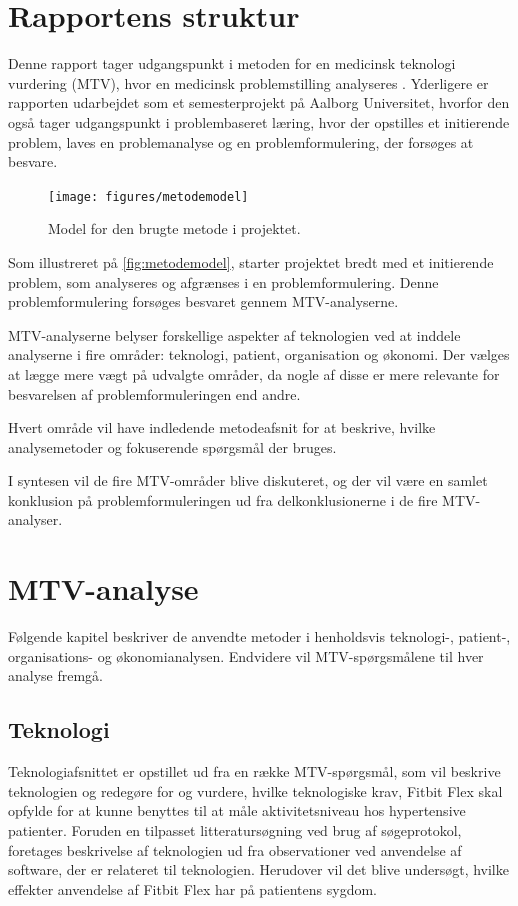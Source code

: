 \chapter{Rapportens struktur} \label{metode}
Denne rapport tager udgangspunkt i metoden for en medicinsk teknologi vurdering (MTV), hvor en medicinsk problemstilling analyseres \citep{mtvhaandbog}. Yderligere er rapporten udarbejdet som et semesterprojekt på Aalborg Universitet, hvorfor den også tager udgangspunkt i problembaseret læring, hvor der opstilles et initierende problem, laves en problemanalyse og en problemformulering, der forsøges at besvare. 


\begin{figure}[H]
	\centering
	\texttt{[image: figures/metodemodel]}
	\caption{Model for den brugte metode i projektet.}
	\label{fig:metodemodel}
\end{figure}

\noindent
Som illustreret på \autoref{fig:metodemodel}, starter projektet bredt med et initierende problem, som analyseres og afgrænses i en problemformulering. Denne problemformulering forsøges besvaret gennem MTV-analyserne. 

MTV-analyserne belyser forskellige aspekter af teknologien ved at inddele analyserne i fire områder: teknologi, patient, organisation og økonomi. Der vælges at lægge mere vægt på udvalgte områder, da nogle af disse er mere relevante for besvarelsen af problemformuleringen end andre. 

Hvert område vil have indledende metodeafsnit for at beskrive, hvilke analysemetoder og fokuserende spørgsmål der bruges. 

I syntesen vil de fire MTV-områder blive diskuteret, og der vil være en samlet konklusion på problemformuleringen ud fra delkonklusionerne i de fire MTV-analyser. 

\chapter{MTV-analyse}
Følgende kapitel beskriver de anvendte metoder i henholdsvis teknologi-, patient-, organisations- og økonomianalysen. Endvidere vil MTV-spørgsmålene til hver analyse fremgå. 

\section{Teknologi}\label{sec:metode_tek}
Teknologiafsnittet er opstillet ud fra en række MTV-spørgsmål, som vil beskrive teknologien og redegøre for og vurdere, hvilke teknologiske krav, Fitbit Flex skal opfylde for at kunne benyttes til at måle aktivitetsniveau hos hypertensive patienter. 
Foruden en tilpasset litteratursøgning ved brug af søgeprotokol, foretages beskrivelse af teknologien ud fra observationer ved anvendelse af software, der er relateret til teknologien.   
Herudover vil det blive undersøgt, hvilke effekter anvendelse af Fitbit Flex har på patientens sygdom.
 
